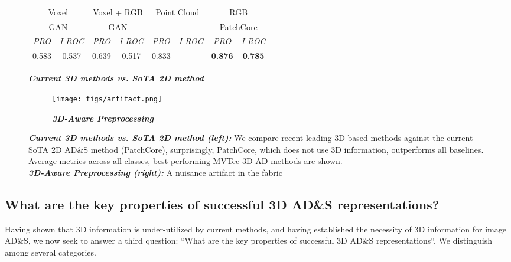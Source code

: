 \documentclass{article}
\begin{document}
\begin{figure}[t]
\begin{subtable}{0.5\textwidth}
\begin{tabular}{c@{\hskip5pt}c@{\hskip5pt}c@{\hskip5pt}c@{\hskip5pt}c@{\hskip5pt}c@{\hskip5pt}c@{\hskip5pt}c@{\hskip5pt}} 
    \toprule
    \multicolumn{2}{c}{Voxel} & \multicolumn{2}{c}{Voxel + RGB} & \multicolumn{2}{c}{Point Cloud} & \multicolumn{2}{c}{RGB}\\
    \multicolumn{2}{c}{GAN} & \multicolumn{2}{c}{GAN} & \multicolumn{2}{c}{} & \multicolumn{2}{c}{PatchCore}\\
    \cmidrule(r){1-2}
    \cmidrule(r){3-4}
    \cmidrule(r){5-6}
    \cmidrule(r){7-8}
    \textit{PRO} & \textit{I-ROC} & \textit{PRO} & \textit{I-ROC} & \textit{PRO} & \textit{I-ROC} & \textit{PRO} & \textit{I-ROC}\\
    
    \cmidrule(r){1-1}
    \cmidrule(r){2-2}
    \cmidrule(r){3-3}
    \cmidrule(r){4-4}
    \cmidrule(r){5-5}
    \cmidrule(r){6-6}
    \cmidrule(r){7-7}
    \cmidrule(r){8-8}
    0.583 & 0.537 & 0.639 & 0.517 & 0.833 & - & \textbf{0.876} & \textbf{0.785}\\
   \bottomrule
    \end{tabular}
    \caption{\textit{\textbf{Current 3D methods vs. SoTA 2D method}}}
    \label{table:2d_v_3d}
\end{subtable}
\begin{subfigure}{0.5\textwidth}
    \centering
    \texttt{[image: figs/artifact.png]}
    \caption{\textit{\textbf{3D-Aware Preprocessing}}}
\label{fig:artifact}
\end{subfigure}
\caption{\textit{\textbf{Current 3D methods vs. SoTA 2D method (left):}} We compare recent leading 3D-based methods against the current SoTA 2D AD\&S method (PatchCore), surprisingly, PatchCore, which does not use 3D information, outperforms all baselines. Average metrics across all classes, best performing MVTec 3D-AD methods are shown.\\ \textit{\textbf{3D-Aware Preprocessing (right):}} A nuisance artifact in the fabric}
\end{figure}




\subsection{What are the key properties of successful 3D AD\&S representations?}
\label{sec:3d_rep_study}
Having shown that 3D information is under-utilized by current methods, and having established the necessity of 3D information for image AD\&S, we now seek to answer a third question: ``What are the key properties of successful 3D AD\&S representations``. We distinguish among several categories.\\
\end{document}
